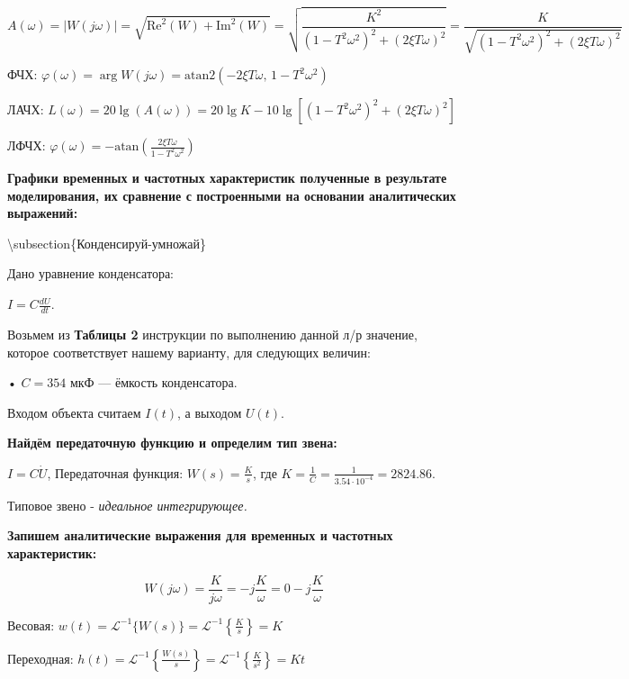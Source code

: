 \begin{par}
$$A(\omega )=|W(j\omega )|=\sqrt{{\text{Re}}^2 (W)+{\text{Im}}^2 (W)}=\sqrt{\frac{K^2 }{(1-T^2 \omega^2 )^2 +(2\xi T\omega )^2 }}=\frac{K}{\sqrt{(1-T^2 \omega^2 )^2 +(2\xi T\omega )^2 }}$$
\end{par}

ФЧХ: $\varphi (\omega )=\arg W(j\omega )=\text{atan2}\left(-2\xi T\omega ,\,1-T^2 \omega^2 \right)$

ЛАЧХ: $L(\omega )=20\lg (A(\omega ))=20\lg K-10\lg \left\lbrack (1-T^2 \omega^2 )^2 +(2\xi T\omega )^2 \right\rbrack$

ЛФЧХ: $\varphi (\omega )=-\text{atan}\left(\frac{2\xi T\omega }{1-T^2 \omega^2 }\right)$



\textbf{Графики временных и частотных характеристик полученные в результате моделирования, их сравнение с построенными на основании аналитических выражений:}







\textbackslash{}subsection\{Конденсируй-умножай\}

Дано уравнение конденсатора:

$I=C\frac{dU}{dt}$.

Возьмем из \textbf{Таблицы 2} инструкции по выполнению данной л/р значение, которое соответствует нашему варианту, для следующих величин:

• $C=354$ мкФ — ёмкость конденсатора.

Входом объекта считаем $I(t)$, а выходом $U(t)$.

\textbf{Найдём передаточную функцию и определим тип звена:}

$I=C\dot{U}$, Передаточная функция: $W(s)=\frac{K}{s}$, где $K=\frac{1}{C}=\frac{1}{3.54\cdot 10^{-4} }=2824.86$.

Типовое звено - \textit{идеальное интегрирующее.}

\textbf{Запишем аналитические выражения для временных и частотных характеристик:}

\begin{par}
$$W(j\omega )=\frac{K}{j\omega }=-j\frac{K}{\omega }=0-j\frac{K}{\omega }$$
\end{par}

Весовая: $w(t)={\mathcal{L}}^{-1} \lbrace W(s)\rbrace ={\mathcal{L}}^{-1} \left\lbrace \frac{K}{s}\right\rbrace =K$

Переходная: $h(t)={\mathcal{L}}^{-1} \left\lbrace \frac{W(s)}{s}\right\rbrace ={\mathcal{L}}^{-1} \left\lbrace \frac{K}{s^2 }\right\rbrace =Kt$

